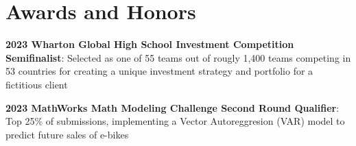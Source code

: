 \documentclass[letterpaper,11pt]{article}
\begin{document}
\section{Awards and Honors}
    \begin{itemize}[leftmargin=0.15in, label={}]
        \small{
            \item{\textbf{2023 Wharton Global High School Investment Competition Semifinalist}{: Selected as one of 55 teams out of rougly 1,400 teams competing in 53 countries for creating a unique investment strategy and portfolio for a fictitious client}}
            \item{\textbf{2023 MathWorks Math Modeling Challenge Second Round Qualifier}{: Top 25\% of submissions, implementing a Vector Autoreggresion (VAR) model to predict future sales of e-bikes}}
        }
 \end{itemize}
\end{document}
